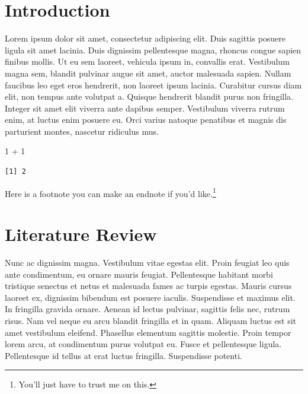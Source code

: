 \documentclass[
  12pt,
]{article}
\newenvironment{Shaded}{\begin{snugshade}}{\end{snugshade}}
\newcommand{\DecValTok}[1]{\textcolor[rgb]{0.68,0.00,0.00}{#1}}
\newcommand{\SpecialCharTok}[1]{\textcolor[rgb]{0.37,0.37,0.37}{#1}}
\begin{document}
\vskip 8.5pt





\section{Introduction}\label{introduction}

Lorem ipsum dolor sit amet, consectetur adipiscing elit. Duis sagittis
posuere ligula sit amet lacinia. Duis dignissim pellentesque magna,
rhoncus congue sapien finibus mollis. Ut eu sem laoreet, vehicula ipsum
in, convallis erat. Vestibulum magna sem, blandit pulvinar augue sit
amet, auctor malesuada sapien. Nullam faucibus leo eget eros hendrerit,
non laoreet ipsum lacinia. Curabitur cursus diam elit, non tempus ante
volutpat a. Quisque hendrerit blandit purus non fringilla. Integer sit
amet elit viverra ante dapibus semper. Vestibulum viverra rutrum enim,
at luctus enim posuere eu. Orci varius natoque penatibus et magnis dis
parturient montes, nascetur ridiculus mus.

\begin{Shaded}
\begin{Highlighting}[]
\DecValTok{1} \SpecialCharTok{+} \DecValTok{1}
\end{Highlighting}
\end{Shaded}

\begin{verbatim}
[1] 2
\end{verbatim}

Here is a footnote you can make an endnote if you'd like.\footnote{You'll
  just have to trust me on this.}

\section{Literature Review}\label{literature-review}

Nunc ac dignissim magna. Vestibulum vitae egestas elit. Proin feugiat
leo quis ante condimentum, eu ornare mauris feugiat. Pellentesque
habitant morbi tristique senectus et netus et malesuada fames ac turpis
egestas. Mauris cursus laoreet ex, dignissim bibendum est posuere
iaculis. Suspendisse et maximus elit. In fringilla gravida ornare.
Aenean id lectus pulvinar, sagittis felis nec, rutrum risus. Nam vel
neque eu arcu blandit fringilla et in quam. Aliquam luctus est sit amet
vestibulum eleifend. Phasellus elementum sagittis molestie. Proin tempor
lorem arcu, at condimentum purus volutpat eu. Fusce et pellentesque
ligula. Pellentesque id tellus at erat luctus fringilla. Suspendisse
potenti.
\end{document}
